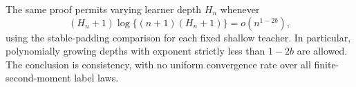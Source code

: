 The same proof permits varying learner depth $H_n$ whenever
\[
 (H_n+1)\log\{(n+1)(H_n+1)\}=o(n^{1-2b}),
\]
using the stable-padding comparison for each fixed shallow teacher.
In particular, polynomially growing depths with exponent strictly
less than $1-2b$ are allowed. The conclusion is consistency, with no
uniform convergence rate over all finite-second-moment label laws.
